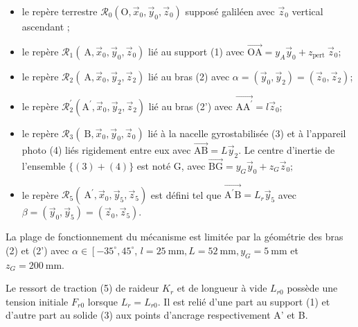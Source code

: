 \begin{itemize}
  \item le repère terrestre $\mathcal{R}_{0}\left(\mathrm{O}, \vec{x}_{0}, \vec{y}_{0}, \vec{z}_{0}\right)$ supposé galiléen avec $\vec{z}_{0}$ vertical ascendant ;

  \item le repère $\mathcal{R}_{1}\left(\mathrm{~A}, \vec{x}_{0}, \vec{y}_{0}, \vec{z}_{0}\right)$ lié au support (1) avec $\overrightarrow{\mathrm{OA}}=y_{A} \vec{y}_{0}+z_{\text {pert }} \vec{z}_{0}$;

  \item le repère $\mathcal{R}_{2}\left(\mathrm{~A}, \vec{x}_{0}, \vec{y}_{2}, \vec{z}_{2}\right)$ lié au bras (2) avec $\alpha=\left(\vec{y}_{0}, \vec{y}_{2}\right)=\left(\vec{z}_{0}, \vec{z}_{2}\right)$;

  \item le repère $\mathcal{R}_{2}^{\prime}\left(\mathrm{A}^{\prime}, \vec{x}_{0}, \vec{y}_{2}, \vec{z}_{2}\right)$ lié au bras (2') avec $\overrightarrow{\mathrm{AA}^{\prime}}=l \vec{z}_{0}$;

  \item le repère $\mathcal{R}_{3}\left(\mathrm{~B}, \vec{x}_{0}, \vec{y}_{0}, \vec{z}_{0}\right)$ lié à la nacelle gyrostabilisée (3) et à l'appareil photo (4) liés rigidement entre eux avec $\overrightarrow{\mathrm{AB}}=L \vec{y}_{2}$. Le centre d'inertie de l'ensemble $\{(3)+(4)\}$ est noté $\mathrm{G}$, avec $\overrightarrow{\mathrm{BG}}=y_{G} \vec{y}_{0}+z_{G} \vec{z}_{0} ;$

  \item le repère $\mathcal{R}_{5}\left(\mathrm{~A}^{\prime}, \vec{x}_{0}, \vec{y}_{5}, \vec{z}_{5}\right)$ est défini tel que $\overrightarrow{\mathrm{A}^{\prime} \mathrm{B}}=L_{r} \vec{y}_{5}$ avec $\beta=\left(\vec{y}_{0}, \vec{y}_{5}\right)=\left(\vec{z}_{0}, \vec{z}_{5}\right)$.

\end{itemize}

La plage de fonctionnement du mécanisme est limitée par la géométrie des bras (2) et (2') avec $\alpha \in\left[-35^{\circ}, 45^{\circ}\right.$, $l=25 \mathrm{~mm}, L=52 \mathrm{~mm}, y_{G}=5 \mathrm{~mm}$ et $z_{G}=200 \mathrm{~mm}$.

Le ressort de traction (5) de raideur $K_{r}$ et de longueur à vide $L_{r 0}$ possède une tension initiale $F_{r 0}$ lorsque $L_{r}=L_{r 0}$. Il est relié d'une part au support (1) et d'autre part au solide (3) aux points d'ancrage respectivement A' et B.


